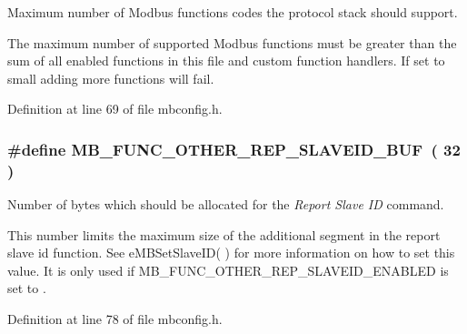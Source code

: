 Maximum number of Modbus functions codes the protocol stack should support. 

The maximum number of supported Modbus functions must be greater than the sum of all enabled functions in this file and custom function handlers. If set to small adding more functions will fail. 

Definition at line 69 of file mbconfig.\+h.

\subsubsection[{\texorpdfstring{M\+B\+\_\+\+F\+U\+N\+C\+\_\+\+O\+T\+H\+E\+R\+\_\+\+R\+E\+P\+\_\+\+S\+L\+A\+V\+E\+I\+D\+\_\+\+B\+UF}{MB_FUNC_OTHER_REP_SLAVEID_BUF}}]{\setlength{\rightskip}{0pt plus 5cm}\#define M\+B\+\_\+\+F\+U\+N\+C\+\_\+\+O\+T\+H\+E\+R\+\_\+\+R\+E\+P\+\_\+\+S\+L\+A\+V\+E\+I\+D\+\_\+\+B\+UF~( 32 )}\hypertarget{group__modbus__cfg_ga4c376ec5ec8bea2ccfe067cd8c05db06}{}\label{group__modbus__cfg_ga4c376ec5ec8bea2ccfe067cd8c05db06}


Number of bytes which should be allocated for the {\itshape Report Slave ID }command. 

This number limits the maximum size of the additional segment in the report slave id function. See e\+M\+B\+Set\+Slave\+I\+D(  ) for more information on how to set this value. It is only used if M\+B\+\_\+\+F\+U\+N\+C\+\_\+\+O\+T\+H\+E\+R\+\_\+\+R\+E\+P\+\_\+\+S\+L\+A\+V\+E\+I\+D\+\_\+\+E\+N\+A\+B\+L\+ED is set to {}. 

Definition at line 78 of file mbconfig.\+h.

